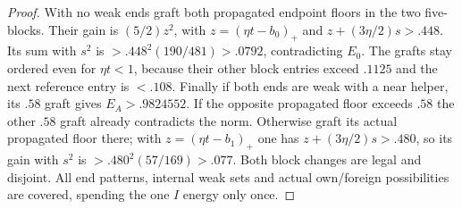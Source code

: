 \documentclass[11pt]{article}
\theoremstyle{definition}
\theoremstyle{remark}
\begin{document}
\begin{proof}
With no weak ends graft both propagated endpoint floors in
the two five-blocks. Their gain is $(5/2)z^2$, with
$z=(\eta t-b_0)_+$ and
$z+(3\eta/2)s>.448$.
Its sum with $s^2$ is $>.448^2(190/481)>.0792$,
contradicting $E_0$. The grafts stay ordered even for
$\eta t<1$, because their other block entries exceed $.1125$
and the next reference entry is $<.108$.
Finally if both ends are weak with a near helper, its $.58$
graft gives $E_A>.9824552$. If the opposite propagated floor
exceeds $.58$ the other $.58$ graft already contradicts the norm.
Otherwise graft its actual propagated floor there; with
$z=(\eta t-b_1)_+$ one has
$z+(3\eta/2)s>.480$, so its gain with $s^2$ is
$>.480^2(57/169)>.077$.
Both block changes are legal and disjoint. All end patterns,
internal weak sets and actual own/foreign possibilities are
covered, spending the one $I$ energy only once.
\end{proof}
\end{document}
